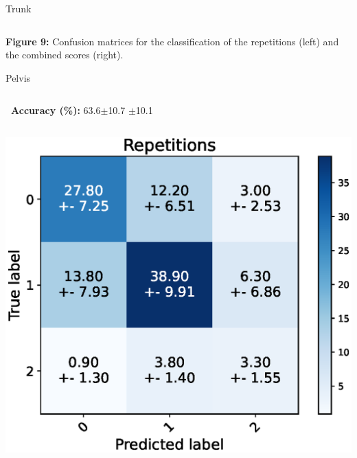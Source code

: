 \begin{frame}[fragile]{Trunk}
\begin{columns}
  \end{columns}
  {\scriptsize\newline\textbf{Figure 9:} Confusion matrices for the classification of the repetitions (left) and the combined scores (right).}
\end{frame}

\begin{frame}[fragile]{Pelvis}
  \begin{columns}
    \textbf{\small~Accuracy (\%):} 63.6$\pm$10.7
    \vspace{0.3cm}
    $\pm$10.1
    \vspace{0.3cm}
  \end{columns}
  \begin{columns}
    \centering
    \includegraphics[width=\textwidth]{files/figs/res/pelvis/cnf-reps.eps}
    \centering

\end{columns}
\end{frame}
